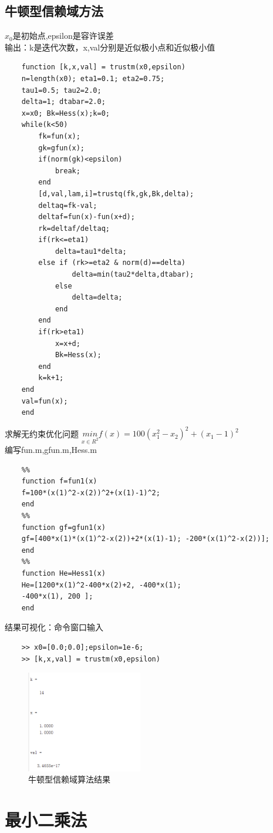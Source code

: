 \documentclass[12pt]{article} %
\begin{document}
	\subsection{牛顿型信赖域方法}
	\indent $x_0$是初始点,epsilon是容许误差\\
	\indent 输出：k是迭代次数，x,val分别是近似极小点和近似极小值
	\begin{lstlisting}
	function [k,x,val] = trustm(x0,epsilon)
	n=length(x0); eta1=0.1; eta2=0.75;
	tau1=0.5; tau2=2.0;
	delta=1; dtabar=2.0;
	x=x0; Bk=Hess(x);k=0;
	while(k<50)
		fk=fun(x);
		gk=gfun(x);
		if(norm(gk)<epsilon)
			break;
		end
		[d,val,lam,i]=trustq(fk,gk,Bk,delta);
		deltaq=fk-val;
		deltaf=fun(x)-fun(x+d);
		rk=deltaf/deltaq;
		if(rk<=eta1)
			delta=tau1*delta;
		else if (rk>=eta2 & norm(d)==delta)
				delta=min(tau2*delta,dtabar);
			else
				delta=delta;
			end
		end
		if(rk>eta1)
			x=x+d;
			Bk=Hess(x);
		end
		k=k+1;
	end
	val=fun(x);
	end
	\end{lstlisting}
	\indent 求解无约束优化问题 $\underset{x\in R^2}{min} f(x)=100(x_1^2-x_2)^2+(x_1-1)^2$\\
	\indent 编写fun.m,gfun.m,Hess.m
	\begin{lstlisting}
	%%
	function f=fun1(x)
	f=100*(x(1)^2-x(2))^2+(x(1)-1)^2;
	end
	%%
	function gf=gfun1(x)
	gf=[400*x(1)*(x(1)^2-x(2))+2*(x(1)-1); -200*(x(1)^2-x(2))];
	end
	%%
	function He=Hess1(x)
	He=[1200*x(1)^2-400*x(2)+2, -400*x(1);
	-400*x(1), 200 ];
	end
	\end{lstlisting}
	\indent 结果可视化：命令窗口输入
	\begin{lstlisting}
	>> x0=[0.0;0.0];epsilon=1e-6;
	>> [k,x,val] = trustm(x0,epsilon)
	\end{lstlisting}
	\begin{figure}[ht]
		\centering
		\includegraphics[width=0.45\textwidth]{trustm.png}
		\caption{牛顿型信赖域算法结果}
		\label{fig:fig1}
	\end{figure}
	\section{最小二乘法}
\end{document}
